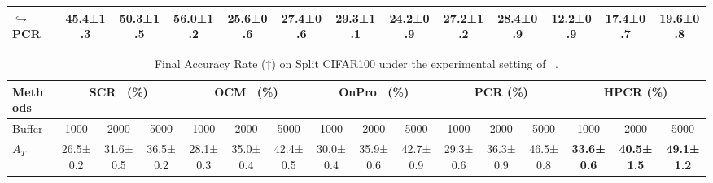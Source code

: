 \begin{table}[t]
\begin{tabular}{l|ccc|ccc|ccc|ccc}
$\hookrightarrow$PCR    & 45.4\scriptsize±1.3& 50.3\scriptsize±1.5                & 56.0\scriptsize±1.2                 & 25.6\scriptsize±0.6                &27.4\scriptsize±0.6                 & 29.3\scriptsize±1.1 & 24.2\scriptsize±0.9                   & 27.2\scriptsize±1.2                  & 28.4\scriptsize±0.9 & 12.2\scriptsize±0.9                   & 17.4\scriptsize±0.7                  & 19.6\scriptsize±0.8\\
\hline
\end{tabular}
\vspace{-2ex}
\end{table}


\begin{table}[t]\small
\renewcommand\tabcolsep{1pt}
\centering
\caption{Final Accuracy Rate (↑) on Split CIFAR100 under the experimental setting of ~\cite{guo2022online}.}
\vspace{-2ex}
\label{moreaccuracy}
\begin{tabular}{l|ccc|ccc|ccc|ccc|ccc}
\hline
Methods & \multicolumn{3}{c|}{SCR~\cite{guo2022online} (\%)} & \multicolumn{3}{c|}{OCM~\cite{guo2022online} (\%)}& \multicolumn{3}{c|}{OnPro~\cite{wei2023online} (\%)} & \multicolumn{3}{c|}{PCR (\%)} & \multicolumn{3}{c}{HPCR (\%)}\\ \hline
Buffer & \multicolumn{1}{c|}{1000} & \multicolumn{1}{c|}{2000} & \multicolumn{1}{c|}{5000} & \multicolumn{1}{c|}{1000}    & \multicolumn{1}{c|}{2000} & \multicolumn{1}{c|}{5000} & \multicolumn{1}{c|}{1000} & \multicolumn{1}{c|}{2000}     &\multicolumn{1}{c|}{5000} & \multicolumn{1}{c|}{1000} & \multicolumn{1}{c|}{2000} &\multicolumn{1}{c|}{5000} & \multicolumn{1}{c|}{1000} & \multicolumn{1}{c|}{2000} & 5000     \\ \hline
$A_T$   & 26.5\scriptsize±0.2& 31.6\scriptsize±0.5                 & 36.5\scriptsize±0.2                 & 28.1\scriptsize±0.3                  & 35.0\scriptsize±0.4                  & 42.4\scriptsize±0.5 & 30.0\scriptsize±0.4                   & 35.9\scriptsize±0.6                  & 42.7\scriptsize±0.9 & 29.3\scriptsize±0.6                   & 36.3\scriptsize±0.9                  & 46.5\scriptsize±0.8 & \textbf{33.6\scriptsize±0.6}                   & \textbf{40.5\scriptsize±1.5}                  & \textbf{49.1\scriptsize±1.2} \\
\hline
\end{tabular}
\vspace{-2ex}
\end{table}



